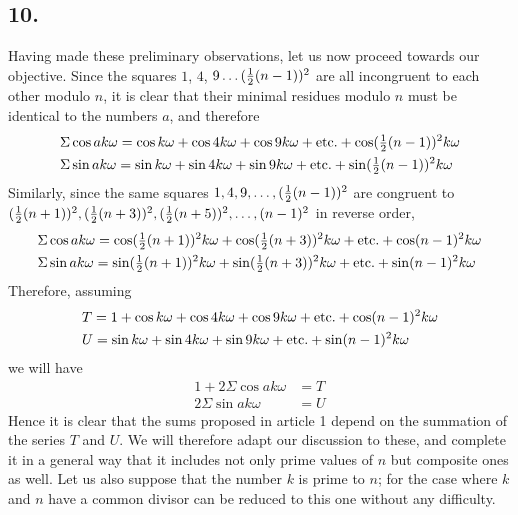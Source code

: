 \documentclass[twoside,12pt]{memoir}
\let\oldfrac\frac
\def\frac#1#2{\mathchoice{\tfrac{#1}{#2}}{\oldfrac{#1}{#2}}{\genfrac{}{}{}{2}{#1}{#2\mathstrut}}{\genfrac{}{}{}{3}{#1}{#2\mathstrut}}}
\begin{document}
\subsection*{10.}

Having made these preliminary observations, let us now proceed towards our objective. Since the squares \(1\), \(4\), \(9 \ldots (\frac{1}{2}(n-1))^2\) are all incongruent to each other modulo \(n\), it is clear that their minimal residues modulo \(n\) must be identical to the numbers \(a\), and therefore
\[\begin{aligned}
&\Sigma \cos a k \omega=\cos k \omega+\cos 4 k \omega+\cos 9 k \omega+\text{etc{.}}+\cos (\frac{1}{2}(n-1))^2 k \omega \\
&\Sigma \sin a k \omega=\sin k \omega+\sin 4 k \omega+\sin 9 k \omega+\text{etc{.}}+\sin (\frac{1}{2}(n-1))^2 k \omega
\end{aligned}\]
Similarly, since the same squares \(1, 4, 9, \ldots, (\frac{1}{2}(n-1))^2\) are congruent to \((\frac{1}{2}(n+1))^2, (\frac{1}{2}(n+3))^2, (\frac{1}{2}(n+5))^2, \ldots, (n-1)^2\) in reverse order,
\[\begin{aligned}
&\Sigma \cos a k \omega=\cos (\frac{1}{2}(n+1))^2 k \omega+\cos (\frac{1}{2}(n+3))^2 k \omega+\text{etc{.}}+\cos (n-1)^2 k \omega \\
&\Sigma \sin a k \omega=\sin (\frac{1}{2}(n+1))^2 k \omega+\sin (\frac{1}{2}(n+3))^2 k \omega+\text{etc{.}}+\sin (n-1)^2 k \omega
\end{aligned}\]
Therefore, assuming
\[\begin{alignedat}[t]{2}
&T=1+\cos k \omega+\cos 4 k \omega+\cos 9 k \omega+\text{etc{.}}+\cos (n-1)^2 k \omega \\
& U= \sin k \omega+\sin 4 k \omega+\sin 9 k \omega+\text{etc{.}}+\sin (n-1)^2 k \omega
\end{alignedat}\]
we will have
\[\begin{aligned}
1+2 \Sigma \cos a k \omega & =T \\
2 \Sigma \sin a k \omega & =U
\end{aligned}\]
Hence it is clear that the sums proposed in article 1 depend on the summation of the series \(T\) and \(U\). We will therefore adapt our discussion to these, and complete it in a general way that it includes not only prime values of \(n\) but composite ones as well. Let us also suppose that the number \(k\) is prime to \(n\); for the case where \(k\) and \(n\) have a common divisor can be reduced to this one without any difficulty.
%
\end{document}
